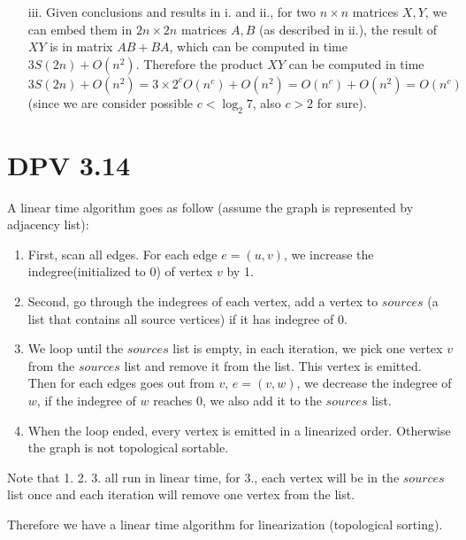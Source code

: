 \documentclass[twoside]{homework}
\begin{document}
\begin{enumerate}
\begin{enumerate}
			\item [iii.] Given conclusions and results in i. and ii., for two $n\times n$ matrices $X, Y$, we can embed them in $2n \times 2n$ matrices $A, B$ (as described in ii.), the result of $XY$ is in matrix $AB + BA$, which can be computed in time $3S(2n) + O(n^2)$. Therefore the product $XY$ can be computed in time $3S(2n) + O(n^2) = 3\times 2^c O(n^c) + O(n^2) = O(n^c) + O(n^2) = O(n^c)$ (since we are consider possible $c < \log_2 7$, also $c > 2$ for sure).
		\end{enumerate}
\end{enumerate}

\section{DPV 3.14}
A linear time algorithm goes as follow (assume the graph is represented by adjacency list):

\begin{enumerate}
	\item First, scan all edges. For each edge $e = (u, v)$, we increase the indegree(initialized to 0) of vertex $v$ by 1.
	\item Second, go through the indegrees of each vertex, add a vertex to $sources$ (a list that contains all source vertices) if it has indegree of 0.
	\item We loop until the $sources$ list is empty, in each iteration, we pick one vertex $v$ from the $sources$ list and remove it from the list. This vertex is emitted. Then for each edges goes out from $v$, $e = (v, w)$, we decrease the indegree of $w$, if the indegree of $w$ reaches 0, we also add it to the $sources$ list.
	\item When the loop ended, every vertex is emitted in a linearized order. Otherwise the graph is not topological sortable.
\end{enumerate}
Note that 1. 2. 3. all run in linear time, for 3., each vertex will be in the $sources$ list once and each iteration will remove one vertex from the list.

Therefore we have a linear time algorithm for linearization (topological sorting).
\end{document}
